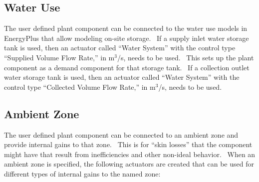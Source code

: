 \subsection{Water Use}\label{water-use-001}

The user defined plant component can be connected to the water use models in EnergyPlus that allow modeling on-site storage.~ If a supply inlet water storage tank is used, then an actuator called ``Water System'' with the control type ``Supplied Volume Flow Rate,'' in m\(^{3}\)/s, needs to be used.~ This sets up the plant component as a demand component for that storage tank.~ If a collection outlet water storage tank is used, then an actuator called ``Water System'' with the control type ``Collected Volume Flow Rate,'' in m\(^{3}\)/s, needs to be used.

\subsection{Ambient Zone}\label{ambient-zone-001}

The user defined plant component can be connected to an ambient zone and provide internal gains to that zone.~ This is for ``skin losses'' that the component might have that result from inefficiencies and other non-ideal behavior.~ When an ambient zone is specified, the following actuators are created that can be used for different types of internal gains to the named zone:

